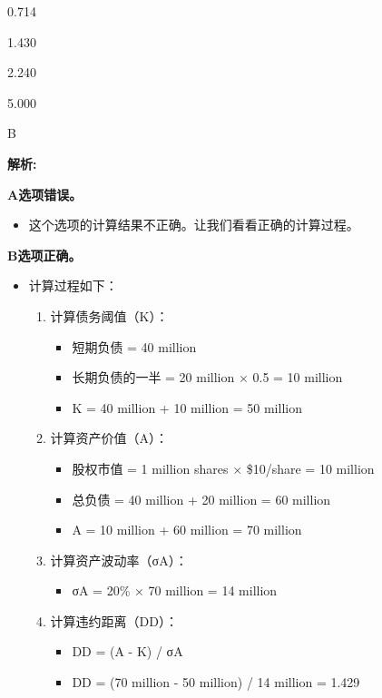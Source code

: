 \documentclass{article}
\newenvironment{explanation}
{\textbf{解析:}\par}
{\par}
\begin{document}
\begin{choices}
    \item 0.714
    \item 1.430
    \item 2.240
    \item 5.000
\end{choices}

\begin{correctanswer}
    B
\end{correctanswer}

\begin{explanation}
    \textbf{A选项错误。}
    \begin{itemize}
        \item 这个选项的计算结果不正确。让我们看看正确的计算过程。
    \end{itemize}
    
    \textbf{B选项正确。}
    \begin{itemize}
        \item 计算过程如下：
        \begin{enumerate}
            \item 计算债务阈值（K）：
            \begin{itemize}
                \item 短期负债 = 40 million
                \item 长期负债的一半 = 20 million × 0.5 = 10 million
                \item K = 40 million + 10 million = 50 million
            \end{itemize}
            \item 计算资产价值（A）：
            \begin{itemize}
                \item 股权市值 = 1 million shares × \$10/share = 10 million
                \item 总负债 = 40 million + 20 million = 60 million
                \item A = 10 million + 60 million = 70 million
            \end{itemize}
            \item 计算资产波动率（σA）：
            \begin{itemize}
                \item σA = 20\% × 70 million = 14 million
            \end{itemize}
            \item 计算违约距离（DD）：
            \begin{itemize}
                \item DD = (A - K) / σA
                \item DD = (70 million - 50 million) / 14 million = 1.429
            \end{itemize}
        \end{enumerate}
    \end{itemize}
    

\end{explanation}
\end{document}
